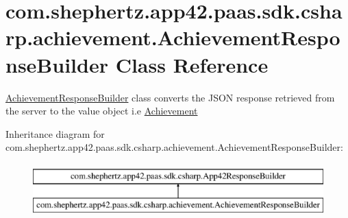 \hypertarget{classcom_1_1shephertz_1_1app42_1_1paas_1_1sdk_1_1csharp_1_1achievement_1_1_achievement_response_builder}{\section{com.\+shephertz.\+app42.\+paas.\+sdk.\+csharp.\+achievement.\+Achievement\+Response\+Builder Class Reference}
\label{classcom_1_1shephertz_1_1app42_1_1paas_1_1sdk_1_1csharp_1_1achievement_1_1_achievement_response_builder}
}


\hyperlink{classcom_1_1shephertz_1_1app42_1_1paas_1_1sdk_1_1csharp_1_1achievement_1_1_achievement_response_builder}{Achievement\+Response\+Builder} class converts the J\+S\+O\+N response retrieved from the server to the value object i.\+e \hyperlink{classcom_1_1shephertz_1_1app42_1_1paas_1_1sdk_1_1csharp_1_1achievement_1_1_achievement}{Achievement}  


Inheritance diagram for com.\+shephertz.\+app42.\+paas.\+sdk.\+csharp.\+achievement.\+Achievement\+Response\+Builder\+:\begin{figure}[H]
\begin{center}
\leavevmode
\includegraphics[height=2.000000cm]{classcom_1_1shephertz_1_1app42_1_1paas_1_1sdk_1_1csharp_1_1achievement_1_1_achievement_response_builder}
\end{center}
\end{figure}
